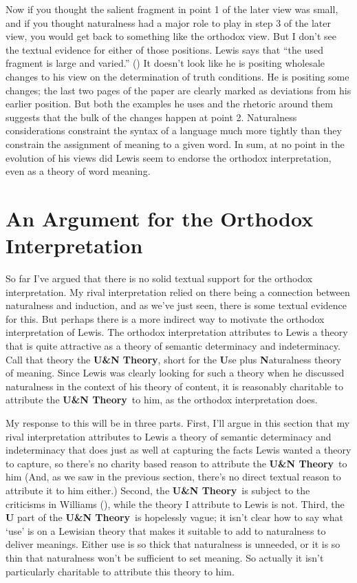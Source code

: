 \documentclass[
  10pt,
  letterpaper,
  DIV=11,
  numbers=noendperiod,
  twoside]{scrartcl}
\begin{document}
Now if you thought the salient fragment in point 1 of the later view was
small, and if you thought naturalness had a major role to play in step 3
of the later view, you would get back to something like the orthodox
view. But I don't see the textual evidence for either of those
positions. Lewis says that ``the used fragment is large and varied.''
() It doesn't look like he is
positing wholesale changes to his view on the determination of truth
conditions. He is positing some changes; the last two pages of the paper
are clearly marked as deviations from his earlier position. But both the
examples he uses and the rhetoric around them suggests that the bulk of
the changes happen at point 2. Naturalness considerations constraint the
syntax of a language much more tightly than they constrain the
assignment of meaning to a given word. In sum, at no point in the
evolution of his views did Lewis seem to endorse the orthodox
interpretation, even as a theory of word meaning.

\section{An Argument for the Orthodox
Interpretation}\label{an-argument-for-the-orthodox-interpretation}

So far I've argued that there is no solid textual support for the
orthodox interpretation. My rival interpretation relied on there being a
connection between naturalness and induction, and as we've just seen,
there is some textual evidence for this. But perhaps there is a more
indirect way to motivate the orthodox interpretation of Lewis. The
orthodox interpretation attributes to Lewis a theory that is quite
attractive as a theory of semantic determinacy and indeterminacy. Call
that theory the \textbf{U\&N Theory}, short for the \textbf{U}se plus
\textbf{N}aturalness theory of meaning. Since Lewis was clearly looking
for such a theory when he discussed naturalness in the context of his
theory of content, it is reasonably charitable to attribute the
\textbf{U\&N Theory}~to him, as the orthodox interpretation does.

My response to this will be in three parts. First, I'll argue in this
section that my rival interpretation attributes to Lewis a theory of
semantic determinacy and indeterminacy that does just as well at
capturing the facts Lewis wanted a theory to capture, so there's no
charity based reason to attribute the \textbf{U\&N Theory}~to him (And,
as we saw in the previous section, there's no direct textual reason to
attribute it to him either.) Second, the \textbf{U\&N Theory}~is subject
to the criticisms in Williams (), while
the theory I attribute to Lewis is not. Third, the \textbf{U} part of
the \textbf{U\&N Theory}~is hopelessly vague; it isn't clear how to say
what `use' is on a Lewisian theory that makes it suitable to add to
naturalness to deliver meanings. Either use is so thick that naturalness
is unneeded, or it is so thin that naturalness won't be sufficient to
set meaning. So actually it isn't particularly charitable to attribute
this theory to him.
\end{document}
